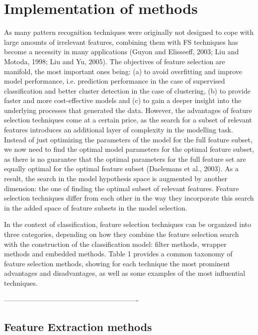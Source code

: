 \chapter{Implementation of methods}
\label{cha:implementation_methods}

As many pattern recognition techniques were originally not designed to cope with large amounts of irrelevant features, combining them with FS techniques has become a necessity in many applications (Guyon and Elisseeff, 2003; Liu and Motoda, 1998; Liu and Yu, 2005). The objectives of feature selection are manifold, the most important ones being: (a) to avoid overfitting and improve model performance, i.e. prediction performance in the case of supervised classification and better cluster detection in the case of clustering, (b) to provide faster and more cost-effective models and (c) to gain a deeper insight into the underlying processes that generated the data. However, the advantages of feature selection techniques come at a certain price, as the search for a subset of relevant features introduces an additional layer of complexity in the modelling task. Instead of just optimizing the parameters of the model for the full feature subset, we now need to find the optimal model parameters for the optimal feature subset, as there is no guarantee that the optimal parameters for the full feature set are equally optimal for the optimal feature subset (Daelemans et al., 2003). As a result, the search in the model hypothesis space is augmented by another dimension: the one of finding the optimal subset of relevant features. Feature selection techniques differ from each other in the way they incorporate this search in the added space of feature subsets in the model selection.

In the context of classification, feature selection techniques can be organized into three categories, depending on how they combine the feature selection search with the construction of the classification model: filter methods, wrapper methods and embedded methods. Table 1 provides a common taxonomy of feature selection methods, showing for each technique the most prominent advantages and disadvantages, as well as some examples of the most influential techniques.


----------------------------------------------------------



\section{Feature Extraction methods} %
\label{sec:feature_selection}

